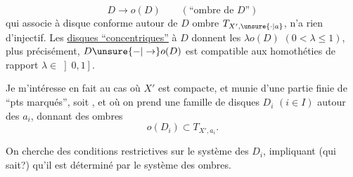 
\[
D\longrightarrow o(D)\qquad (\text{``ombre de }D\text{''})
\]
qui associe à  disque conforme autour de $D$  ombre  $T_{X',\unsure{\cdot|a}}$, n'a rien d'injectif. Les \uline{disques ``concentriques''} à $D$ donnent les $\lambda o(D)$ $(0<\lambda\leq1)$, plus précisément, $D\unsure{-|\to}o(D)$ est compatible aux homothéties de rapport  $\lambda\in\left]0,1\right]$.

Je m'intéresse en fait au cas où $X'$ est compacte, et munie d'une  partie finie de ``pts marqués'', soit , et où on prend une famille de disques $D_i$ $(i\in I)$  autour des $a_i$, donnant des ombres
\[
o(D_i)\subset T_{X',a_i}.
\]

On cherche des conditions restrictives  sur le système des $D_i$, impliquant (qui sait?) qu'il est déterminé par le système des ombres.
